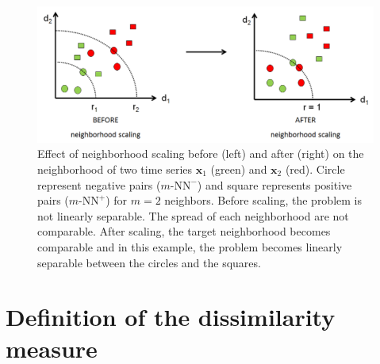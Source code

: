 \begin{figure}[h!]
	\centering
	\includegraphics[width=1\linewidth]{images/Neighborhood_scaling}
	\caption{Effect of neighborhood scaling before (left) and after (right) on the neighborhood of two time series $\textbf{x}_1$ (green) and $\textbf{x}_2$ (red). Circle represent negative pairs ($m\text{-NN}^-$) and square represents positive pairs ($m\text{-NN}^+$) for $m=2$ neighbors. Before scaling, the problem is not linearly separable. The spread of each neighborhood are not comparable. After scaling, the target neighborhood becomes comparable and in this example, the problem becomes linearly separable between the circles and the squares.}
	\label{fig:Neighborhood_scaling}
\end{figure}
\section{Definition of the dissimilarity measure}
